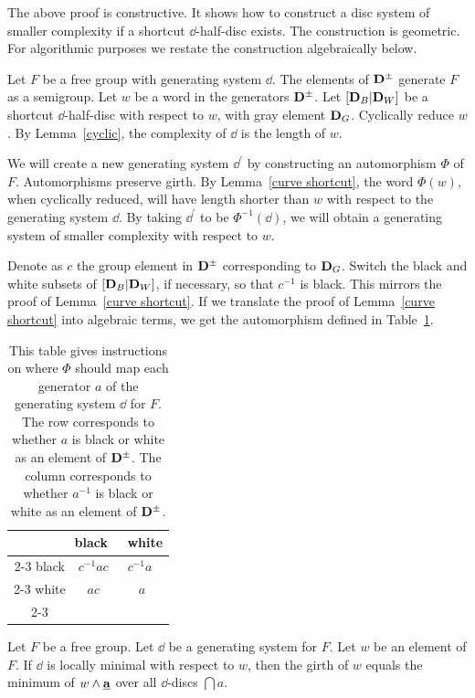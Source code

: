The above proof is constructive.  It shows how to construct a disc system of smaller complexity if a shortcut $\dd$-half-disc exists.  The construction is geometric.  For algorithmic purposes we restate the construction algebraically below.

Let $F$ be a free group with generating system $\dd$.  The elements of $\mathbf{D}^\pm$ generate $F$ as a semigroup.  Let $w$ be a word in the generators $\mathbf{D}^\pm$.  Let $[\mathbf{D}_B | \mathbf{D}_W]$ be a shortcut $\dd$-half-disc with respect to $w$, with gray element $\mathbf{D}_G$.  Cyclically reduce $w$.  By Lemma~\ref{cyclic}, the complexity of $\dd$ is the length of $w$.

We will create a new generating system $\dd^{\prime}$ by constructing an automorphism $\Phi$ of $F$.  Automorphisms preserve girth.  By Lemma~\ref{curve shortcut}, the word $\Phi(w)$, when cyclically reduced, will have length shorter than $w$ with respect to the generating system $\dd$.  By taking $\dd^{\prime}$ to be $\Phi^{-1}(\dd)$, we will obtain a generating system of smaller complexity with respect to $w$.

Denote as $c$ the group element in $\mathbf{D}^\pm$ corresponding to $\mathbf{D}_G$.  Switch the black and white subsets of $[\mathbf{D}_B | \mathbf{D}_W]$, if necessary, so that $c^{-1}$ is black.  This mirrors the proof of Lemma~\ref{curve shortcut}.  If we translate the proof of Lemma~\ref{curve shortcut} into algebraic terms, we get the automorphism defined in Table~\ref{automorphism}.

\begin{table}
\begin{center}
\begin{tabular}{c|c|c|}
\multicolumn{3}{r}{black \ \ white} \\ \cline{2-3}
black & $c^{-1}ac$ & \ $c^{-1}a$ \ \\ \cline{2-3}
white & $ac$ & $a$ \\ \cline{2-3 }
\end{tabular}
\end{center}
\caption{This table gives instructions on where $\Phi$ should map each generator $a$ of the generating system $\dd$ for $F$.  The row corresponds to whether $a$ is black or white as an element of $\mathbf{D}^\pm$.  The column corresponds to whether $a^{-1}$ is black or white as an element of $\mathbf{D}^\pm$.}
\label{automorphism}
\end{table}



\begin{lemma}
\label{locally-minimal}
Let $F$ be a free group.  Let $\dd$ be a generating system for $F$.  Let $w$ be an element of $F$.  If $\dd$ is locally minimal with respect to $w$, then the girth of $w$ equals the minimum of $w\wedge\mathbf{\underline{a}}$ over all $\dd$-discs $\dint{a}$.
\end{lemma}

